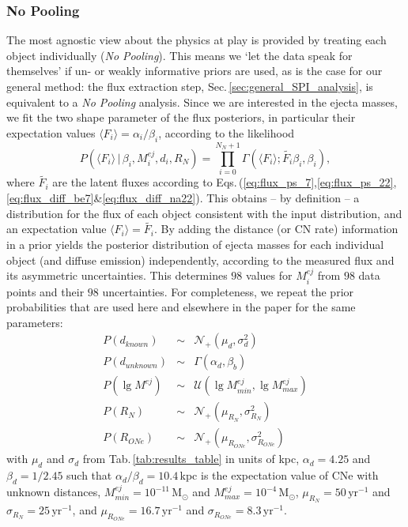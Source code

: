 \documentclass{aa}
\newcommand{\mrm}[1]{\mathrm{#1}}
\begin{document}
\subsubsection{No Pooling}\label{sec:no_pooling}
%
The most agnostic view about the physics at play is provided by treating each object individually (\textit{No Pooling}).
%
This means we `let the data speak for themselves' if un- or weakly informative priors are used, as is the case for our general method:
%
the flux extraction step, Sec.\,\ref{sec:general_SPI_analysis}, is equivalent to a \textit{No Pooling} analysis.
%
Since we are interested in the ejecta masses, we fit the two shape parameter of the flux posteriors, in particular their expectation values $\langle F_i \rangle = \alpha_i/\beta_i$, according to the likelihood
%
\begin{equation}
	P(\langle F_i \rangle\, | \,\beta_i, M_i^{ej}, d_i, R_N) = \prod_{i=0}^{N_N+1} \Gamma(\langle F_i \rangle ; \tilde{F_i}\beta_i,\beta_i)\mrm{,}
	\label{eq:no_pooling_sampling}
\end{equation}
%
where $\tilde{F_i}$ are the latent fluxes according to Eqs.\,(\ref{eq:flux_ps_7},\ref{eq:flux_ps_22},\ref{eq:flux_diff_be7}\&\ref{eq:flux_diff_na22}).
%
This obtains -- by definition -- a distribution for the flux of each object consistent with the input distribution, and an expectation value $\langle F_i \rangle = \tilde{F_i}$.
%
By adding the distance (or CN rate) information in a prior yields the posterior distribution of ejecta masses for each individual object (and diffuse emission) independently, according to the measured flux and its asymmetric uncertainties.
%
This determines $98$ values for $M_i^{ej}$ from $98$ data points and their $98$ uncertainties.
%
For completeness, we repeat the prior probabilities that are used here and elsewhere in the paper for the same parameters:
%
\begin{eqnarray}
	P(d_{known}) & \sim & \mathscr{N}_+(\mu_d,\sigma_d^2) \nonumber\\
	P(d_{unknown}) & \sim & \Gamma(\alpha_d, \beta_b) \nonumber\\
	P(\lg M^{ej}) & \sim & \mathscr{U}(\lg M_{min}^{ej},\lg M_{max}^{ej}) \nonumber \\
	P(R_N) & \sim & \mathscr{N}_+(\mu_{R_N},\sigma_{R_N}^2) \nonumber\\
	P(R_{ONe}) & \sim & \mathscr{N}_+(\mu_{R_{ONe}},\sigma_{R_{ONe}}^2) \label{eq:priors}
\end{eqnarray}
%
with $\mu_d$ and $\sigma_d$ from Tab.\,\ref{tab:results_table} in units of kpc, $\alpha_d = 4.25$ and $\beta_d = 1/2.45$ such that $\alpha_d/\beta_d = 10.4$\,kpc is the expectation value of CNe with unknown distances, $M_{min}^{ej} = 10^{-11}\,\mrm{M_{\odot}}$ and $M_{max}^{ej} = 10^{-4}\,\mrm{M_{\odot}}$, $\mu_{R_N} = 50\,\mrm{yr^{-1}}$ and $\sigma_{R_N} = 25\,\mrm{yr^{-1}}$, and $\mu_{R_{ONe}} = 16.7\,\mrm{yr^{-1}}$ and $\sigma_{R_{ONe}} = 8.3\,\mrm{yr^{-1}}$.
\end{document}

